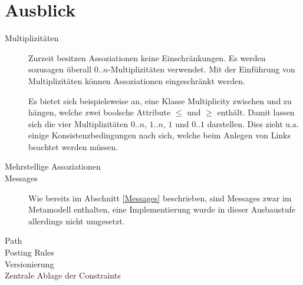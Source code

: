 \section{Ausblick}



\begin{description}
  \item[Multiplizitäten] Zurzeit besitzen Assoziationen keine Einschränkungen. 
Es werden sozusagen überall $0..n$-Multiplizitäten verwendet. 
Mit der Einführung von Multiplizitäten können Assoziationen eingeschränkt werden.
 
Es bietet sich beispielsweise an, eine Klasse Multiplicity zwischen  und  zu hängen,
welche zwei boolsche Attribute $\leq$ und $\geq$ enthält. 
Damit lassen sich die vier Multiplizitäten $0..n$, $1..n$, $1$ und $0..1$ darstellen.
Dies zieht u.a. einige Konsistenzbedingungen nach sich, welche beim Anlegen von Links beachtet werden müssen. 
  \item[Mehrstellige Assoziationen]
  \item[Messages] Wie bereits im Abschnitt \ref{Messages} beschrieben, sind Messages zwar im Metamodell enthalten, 
  eine Implementierung wurde in dieser Ausbaustufe allerdings nicht umgesetzt. 
  \item[Path]
  \item[Posting Rules]
  \item[Versionierung]
  \item[Zentrale Ablage der Constraints]
\end{description}
  